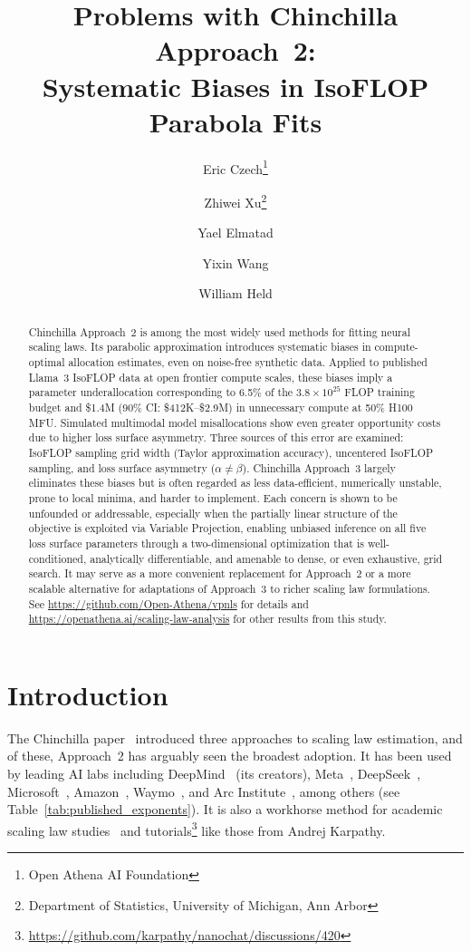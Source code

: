 \documentclass[11pt]{article}
\title{Problems with Chinchilla Approach~2:\\
Systematic Biases in IsoFLOP Parabola Fits}
\author{
    Eric Czech\thanks{Open Athena AI Foundation} \and
    Zhiwei Xu\thanks{Department of Statistics, University of Michigan, Ann Arbor} \and
    Yael Elmatad\footnotemark[1] \and
    Yixin Wang\footnotemark[2] \and
    William Held\footnotemark[1]
}
\date{}
\begin{document}
\maketitle

\begin{abstract}
Chinchilla Approach~2 is among the most widely used methods for fitting neural
scaling laws. Its parabolic approximation introduces systematic biases in
compute-optimal allocation estimates, even on noise-free synthetic data. Applied
to published Llama~3 IsoFLOP data at open frontier compute scales, these biases
imply a parameter underallocation corresponding to 6.5\% of the
$3.8\times10^{25}$ FLOP training budget and \$1.4M (90\% CI:
\$412K--\$2.9M) in unnecessary compute at 50\% H100 MFU. Simulated multimodal
model misallocations show even greater opportunity costs due to higher loss
surface asymmetry. Three sources of this error are examined: IsoFLOP sampling
grid width (Taylor approximation accuracy), uncentered IsoFLOP sampling, and
loss surface asymmetry ($\alpha \neq \beta$). Chinchilla Approach~3 largely
eliminates these biases but is often regarded as less data-efficient, numerically
unstable, prone to local minima, and harder to implement. Each concern is shown
to be unfounded or addressable, especially when the partially linear structure
of the objective is exploited via Variable Projection, enabling unbiased
inference on all five loss surface parameters through a two-dimensional
optimization that is well-conditioned, analytically differentiable, and amenable
to dense, or even exhaustive, grid search. It may serve as a more convenient
replacement for Approach~2 or a more scalable alternative for adaptations of
Approach~3 to richer scaling law formulations. See
\url{https://github.com/Open-Athena/vpnls} for details and
\url{https://openathena.ai/scaling-law-analysis} for other results from this
study.
\end{abstract}

\section{Introduction}
\label{sec:introduction}

The Chinchilla paper~\citep{chinchilla} introduced three approaches to scaling
law estimation, and of these, Approach~2 has arguably seen the broadest
adoption. It has been used by leading AI labs including
DeepMind~\citep{chinchilla,sovit} (its creators),
Meta~\citep{llama3,optibert,beyond_language_modeling}, DeepSeek~\citep{deepseek},
Microsoft~\citep{ehr_scaling}, Amazon~\citep{il_scaling},
Waymo~\citep{waymo_scaling}, and Arc Institute~\citep{evo}, among others (see Table~\ref{tab:published_exponents}). It
is also a workhorse method for academic scaling law
studies~\citep{dit_scaling,dlm_scaling,biosignal_scaling} and
tutorials\footnote{\url{https://github.com/karpathy/nanochat/discussions/420}}
like those from Andrej Karpathy.
\end{document}
